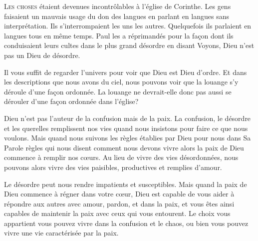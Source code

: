 \lettrine{L}{es choses} étaient devenues incontrôlables
 à l'église de Corinthe.
 Les gens faisaient un mauvais usage du don des langues
 en parlant en langues sans interprétation.
 Ils s'interrompaient les uns les autres.
 Quelquefois ils parlaient en langues tous en même temps.
 Paul les a réprimandés pour la fa\c{c}on dont ils conduisaient
 leurs cultes dans le plus grand désordre en disant\frcolon{} 
 \Og Voyons, Dieu n'est pas un Dieu de désordre. \Fg{}

Il vous suffit de regarder l'univers
 pour voir que Dieu est Dieu d'ordre.
 Et dans les descriptions que nous avons du ciel,
 nous pouvons voir que la louange s'y déroule d'une fa\c{c}on ordonnée.
 La louange ne devrait-elle donc pas aussi se dérouler
 d'une fa\c{c}on ordonnée dans l'église?


Dieu n'est pas l'auteur de la confusion mais de la paix.
 La confusion, le désordre et les querelles remplissent nos vies
 quand nous insistons pour faire ce que nous voulons.
 Mais quand nous suivons les règles établies par Dieu pour nous dans Sa Parole
 \ocadr règles qui nous disent comment nous devons vivre \fcadr{}
 alors la paix de Dieu commence à remplir nos c\oe{}urs.
 Au lieu de vivre des vies désordonnées,
 nous pouvons alors vivre des vies paisibles, productives et remplies d'amour.

Le désordre peut nous rendre impatients et susceptibles.
 Mais quand la paix de Dieu commence à régner dans votre c\oe{}ur,
 Dieu est capable de vous aider à répondre aux autres avec amour,
 pardon, et dans la paix, et vous êtes ainsi capables de maintenir
 la paix avec ceux qui vous entourent.
 Le choix vous appartient \ocadr vous pouvez vivre dans la confusion et le chaos,
 ou bien vous pouvez vivre une vie caractérisée par la paix.

\dvrule






